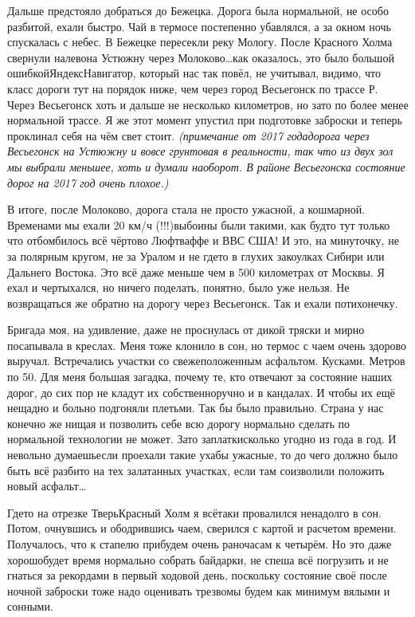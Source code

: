 Дальше предстояло добраться до Бежецка. Дорога была нормальной, не особо разбитой, ехали быстро. Чай в термосе постепенно убавлялся, а за окном ночь спускалась с небес. В Бежецке пересекли реку Мологу. После Красного Холма свернули налево\mdash на Устюжну через Молоково\ldots  как оказалось, это было большой ошибкой\mdash Яндекс\sdash Навигатор, который нас так повёл, не учитывал, видимо, что класс дороги тут на порядок ниже, чем через город Весьегонск по трассе Р. Через Весьегонск хоть и дальше не несколько километров, но зато по более менее нормальной трассе. Я же этот момент упустил при подготовке заброски и теперь проклинал себя на чём свет стоит. \textit{(примечание от 2017 года\mdash дорога через Весьегонск на Устюжну и вовсе грунтовая в реальности, так что из двух зол мы выбрали меньшее, хоть и думали наоборот. В районе Весьегонска состояние дорог на 2017 год очень плохое.)}

В итоге, после Молоково, дорога стала не просто ужасной, а кошмарной. Временами мы ехали 20 км/ч (!!!)\mdash выбоины были такими, как будто тут только что отбомбилось всё чёртово Люфтваффе и ВВС США! И это, на минуточку, не за полярным кругом, не за Уралом и не где\sdash то в глухих закоулках Сибири или Дальнего Востока. Это всё даже меньше чем в 500 километрах от Москвы. Я ехал и чертыхался, но ничего поделать, понятно, было уже нельзя. Не возвращаться же обратно на дорогу через Весьегонск. Так и ехали потихонечку. 

Бригада моя, на удивление, даже не проснулась от дикой тряски и мирно посапывала в креслах. Меня тоже клонило в сон, но термос с чаем очень здорово выручал. Встречались участки со свежеположенным асфальтом. Кусками. Метров по 50. Для меня большая загадка, почему те, кто отвечают за состояние наших дорог, до сих пор не кладут их собственноручно и в кандалах. И чтобы их ещё нещадно и больно подгоняли плетьми. Так бы было правильно. Страна у нас конечно же нищая и позволить себе всю дорогу нормально сделать по нормальной технологии не может. Зато заплатки\mdash сколько угодно из года в год. И невольно думаешь\mdash если проехали такие ухабы ужасные, то до чего должно было быть всё разбито на тех залатанных участках, если там соизволили положить новый асфальт\ldots 
 
Где\sdash то на отрезке Тверь\sdash Красный Холм я всё\sdash таки провалился ненадолго в сон. Потом, очнувшись и ободрившись чаем, сверился с картой и расчетом времени. Получалось, что к стапелю прибудем очень рано\mdash часам к четырём. Но это даже хорошо\mdash будет время нормально собрать байдарки, не спеша всё погрузить и не гнаться за рекордами в первый ходовой день, поскольку состояние своё после ночной заброски тоже надо оценивать трезво\mdash мы будем как минимум вялыми и сонными. 

